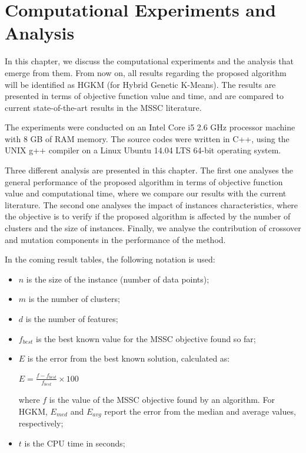 \chapter{Computational Experiments and Analysis}
\label{chap:experiments}
In this chapter, we discuss the computational experiments and the analysis that emerge from them. From now on, all results regarding the proposed algorithm will be identified as HGKM (for Hybrid Genetic K-Means). The results are presented in terms of objective function value and time, and are compared to current state-of-the-art results in the MSSC literature.

The experiments were conducted on an Intel Core i5 2.6 GHz processor machine with 8 GB of RAM memory. The source codes were written in C++, using the UNIX g++ compiler on a Linux Ubuntu 14.04 LTS 64-bit operating system.

Three different analysis are presented in this chapter. The first one analyses the general performance of the proposed algorithm in terms of objective function value and computational time, where we compare our results with the current literature. The second one analyses the impact of instances characteristics, where the objective is to verify if the proposed algorithm is affected by the number of clusters and the size of instances. Finally, we analyse the contribution of crossover and mutation components in the performance of the method.

In the coming result tables, the following notation is used:

\begin{itemize}
	\item $n$ is the size of the instance (number of data points);
	
	\item $m$ is the number of clusters;

	\item $d$ is the number of features;
	
	\item $f_{best}$ is the best known value for the MSSC objective found so far;

	\item $E$ is the error from the best known solution, calculated as:

		\begin{center}
		\large
			$E = \frac{f - f_{best}}{f_{best}} \times 100$
		\end{center}
		
	where $f$ is the value of the MSSC objective found by an algorithm. For HGKM, $E_{med}$ and $E_{avg}$ report the error from the median and average values, respectively;
	
	\item $t$ is the CPU time in seconds;
	

\end{itemize}

